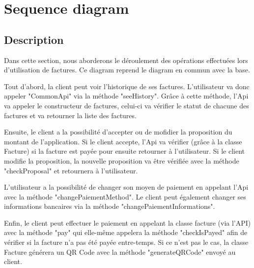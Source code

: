 \section{Sequence diagram}
\subsection{Description}

\begin{flushleft}
Dans cette section, nous aborderons le déroulement des opérations effectuées lors d'utilisation de factures. Ce diagram reprend le diagram en commun avec la base.
\end{flushleft}

\begin{flushleft}
Tout d'abord, la client peut voir l'historique de ses factures. L'utilisateur va donc appeler "CommonApi" via la méthode "seeHistory". Grâce à cette méthode, l'Api va appeler le constructeur de factures, celui-ci va vérifier le statut de chacune des factures et va retourner la liste des factures.
\end{flushleft}

\begin{flushleft}
Ensuite, le client a la possibilité d'accepter ou de mofidier la proposition du montant de l'application. Si le client accepte, l'Api va vérifier (grâce à la classe Facture) si la facture est payée pour ensuite retourner à l'utilisateur. Si le client modifie la proposition, la nouvelle proposition va être vérifiée avec la méthode "checkProposal" et retournera à l'utilisateur.
\end{flushleft}

\begin{flushleft}
L'utilisateur a la possibilité de changer son moyen de paiement en appelant l'Api avec la méthode "changePaiementMethod". Le client peut également changer ses informations bancaires via la méthode "changePaiementInformations".
\end{flushleft}

\begin{flushleft}
Enfin, le client peut effectuer le paiement en appelant la classe facture (via l'API) avec la méthode "pay" qui elle-même appelera la méthode "checkIsPayed" afin de vérifier si la facture n'a pas été payée entre-temps. Si ce n'est pas le cas, la classe Facture générera un QR Code avec la méthode "generateQRCode" envoyé au client.
\end{flushleft}

